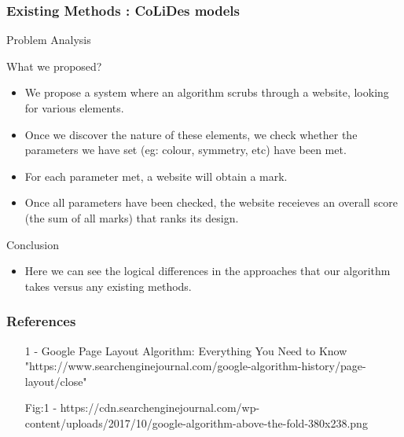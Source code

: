 \documentclass[11pt]{beamer}
\begin{document}
\begin{frame}
	\frametitle{{Existing Methods : CoLiDes models}}
\end{frame}
	\begin{frame}{Problem Analysis}
		\end{frame}
		\begin{frame}{What we proposed?}
			\begin{itemize}
				\item We propose a system where an algorithm scrubs through a website, looking for various elements.
				\item Once we discover the nature of these elements, we check whether the parameters we have set (eg: colour, symmetry, etc) have been met.
				\item For each parameter met, a website will obtain a mark.
				\item Once all parameters have been checked, the website receieves an overall score (the sum of all marks) that ranks its design.
					\end{itemize}	
	\end{frame}
	\begin{frame}{Conclusion}
		\begin{itemize}
			\item Here we can see the logical differences in the approaches that our algorithm takes versus any existing methods.
		\end{itemize}
	\end{frame}
	\begin{frame}
		\frametitle{\LARGE \textbf{References}}
		\begin{itemize}
			\item [1] - Google Page Layout Algorithm: Everything You Need to Know 
			"https://www.searchenginejournal.com/google-algorithm-history/page-layout/close"
			\item [Fig:1] - https://cdn.searchenginejournal.com/wp-content/uploads/2017/10/google-algorithm-above-the-fold-380x238.png
		\end{itemize}
	\end{frame}
\end{document}
